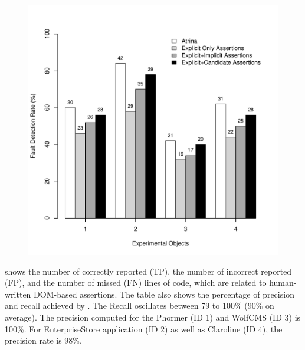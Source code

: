 \begin{figure}[!t]
  \centering
  \includegraphics[width=1\hsize]{r-scripts/assertionTypeFaultDetec}
  \vspace{-0.18in} 
  \vspace{-0.1in} 
  \label{Fig:assertionTypeFaultDetec}
 
\end{figure}
 shows the number of  correctly reported (TP), the number of incorrect reported (FP), and the number of missed (FN) \javascript lines of code, which are related to human-written DOM-based assertions. The table also shows the percentage of precision and recall achieved by \tool. The Recall oscillates between 79 to 100\% (90\% on average). The precision computed for the Phormer (ID 1) and WolfCMS (ID 3) is 100\%. For EnterpriseStore application (ID 2) as well as Claroline (ID 4), the precision rate is 98\%.

